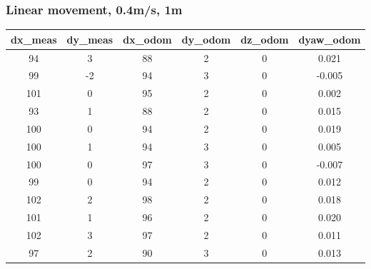 \documentclass[a4paper, 12pt]{article}
\begin{document}
    \subsubsection{Linear movement, 0.4m/s, 1m}
    \begin{table}[H]
    \scriptsize
    \begin{tabular}{@{}cccccc@{}}
    \toprule
    \textbf{dx\_meas} & \textbf{dy\_meas} & \textbf{dx\_odom} & \textbf{dy\_odom} & \textbf{dz\_odom} & \textbf{dyaw\_odom} \\ \midrule
    94                    & 3                     & 88                & 2                 & 0                 & 0.021               \\
    99                    & -2                    & 94                & 3                 & 0                 & -0.005              \\
    101                   & 0                     & 95                & 2                 & 0                 & 0.002               \\
    93                    & 1                     & 88                & 2                 & 0                 & 0.015               \\
    100                   & 0                     & 94                & 2                 & 0                 & 0.019               \\
    100                   & 1                     & 94                & 3                 & 0                 & 0.005               \\
    100                   & 0                     & 97                & 3                 & 0                 & -0.007              \\
    99                    & 0                     & 94                & 2                 & 0                 & 0.012               \\
    102                   & 2                     & 98                & 2                 & 0                 & 0.018               \\
    101                   & 1                     & 96                & 2                 & 0                 & 0.020               \\
    102                   & 3                     & 97                & 2                 & 0                 & 0.011               \\
    97                    & 2                     & 90                & 3                 & 0                 & 0.013               \\

\end{tabular}
\end{table}
\end{document}
